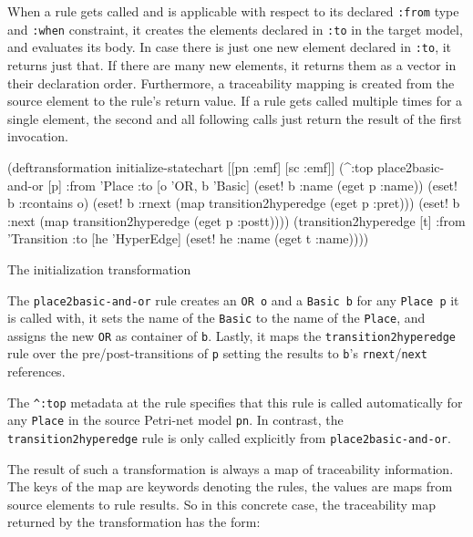 \documentclass[11pt]{article}
\begin{document}
When a rule gets called and is applicable with respect to its declared
\verb|:from| type and \verb|:when| constraint, it creates the elements declared
in \verb|:to| in the target model, and evaluates its body.  In case there is
just one new element declared in \verb|:to|, it returns just that.  If there
are many new elements, it returns them as a vector in their declaration order.
Furthermore, a traceability mapping is created from the source element to the
rule's return value.  If a rule gets called multiple times for a single
element, the second and all following calls just return the result of the first
invocation.


\begin{listing}[H]
  \begin{clojurecode}
(deftransformation initialize-statechart [[pn :emf] [sc :emf]]
  (^:top place2basic-and-or [p]
         :from 'Place
         :to [o 'OR, b 'Basic]
         (eset! b :name (eget p :name))
         (eset! b :rcontains o)
         (eset! b :rnext (map transition2hyperedge
                              (eget p :pret)))
         (eset! b :next  (map transition2hyperedge
                              (eget p :postt))))
  (transition2hyperedge [t]
         :from 'Transition
         :to [he 'HyperEdge]
         (eset! he :name (eget t :name))))
  \end{clojurecode}
  \label{lst:init}
  \caption{The initialization transformation}
\end{listing}

\begin{sloppypar}
  The \verb|place2basic-and-or| rule creates an \verb|OR o| and a
  \verb|Basic b| for any \verb|Place p| it is called with, it sets the name of
  the \verb|Basic| to the name of the \verb|Place|, and assigns the new
  \verb|OR| as container of \verb|b|.  Lastly, it maps the
  \verb|transition2hyperedge| rule over the pre/post-transitions of \verb|p|
  setting the results to \verb|b|'s \verb|rnext|/\verb|next| references.

  The \verb|^:top| metadata at the rule specifies that this rule is called
  automatically for any \verb|Place| in the source Petri-net model \verb|pn|.
  In contrast, the \verb|transition2hyperedge| rule is only called explicitly
  from \verb|place2basic-and-or|.
\end{sloppypar}

The result of such a transformation is always a map of traceability
information.  The keys of the map are keywords denoting the rules, the values
are maps from source elements to rule results.  So in this concrete case, the
traceability map returned by the transformation has the form:
\end{document}
